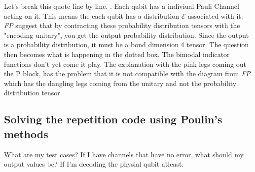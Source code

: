 Let's break this quote line by line. . Each qubit has a indiviual Pauli Channel acting on it. This means the each qubit has a distribution $\mathcal{E}$ associated with it. \textit{FP} suggest that by contracting these probability distribution tensors with the "encoding unitary", you get the output probability distribution.  Since the output is a probability distribution, it must be a bond dimension 4 tensor. The question then becomes what is happening in the dotted box. The bimodal indicator functions don't yet come it play. The explanation with the pink legs coming out the P block, has the problem that it is not compatible with the diagram from \textit{FP} which has the dangling legs coming from the unitary and not the probability distribution tensor. 

\subsection[]{Solving the repetition code using Poulin's methods}
What are my test cases? If I have channels that have no error, what should my output values be? If I'm decoding the physial qubit atleast. 